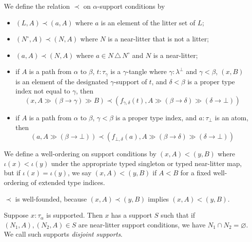 \documentclass{article}
\begin{document}
\begin{definition}
    We define the relation \( \prec \) on \( \alpha \)-support conditions by
    \begin{itemize}
        \item \( (L, A) \prec (a, A) \) where \( a \) is an element of the litter set of \( L \);
        \item \( (N^\circ, A) \prec (N, A) \) where \( N \) is a near-litter that is not a litter;
        \item \( (a, A) \prec (N, A) \) where \( a \in N\,\triangle\,N^\circ \) and \( N \) is a near-litter;
        \item
            if \( A \) is a path from \( \alpha \) to \( \beta \),
            \( t : \tau_\gamma \) is a \( \gamma \)-tangle where \( \gamma : \lambda^\bot \) and \( \gamma < \beta \),
            \( (x, B) \) is an element of the designated \( \gamma \)-support of \( t \),
            and \( \delta < \beta \) is a proper type index not equal to \( \gamma \),
            then
            \[ (x, A \gg (\beta \longrightarrow \gamma) \gg B) \prec (f_{\gamma,\delta}(t), A \gg (\beta \longrightarrow \delta) \gg (\delta \longrightarrow \bot)) \]
        \item if \( A \) is a path from \( \alpha \) to \( \beta \), \( \gamma < \beta \) is a proper type index, and \( a : \tau_\bot \) is an atom, then
        \[ (a, A \gg (\beta \longrightarrow \bot)) \prec (f_{\bot,\delta}(a), A \gg (\beta \longrightarrow \delta) \gg (\delta \longrightarrow \bot)) \]
    \end{itemize}
\end{definition}
\begin{definition}
    We define a well-ordering on support conditions by \( (x, A) < (y, B) \) where \( \iota(x) < \iota(y) \) under the appropriate typed singleton or typed near-litter map, but if \( \iota(x) = \iota(y) \), we say \( (x, A) < (y, B) \) if \( A < B \) for a fixed well-ordering of extended type indices.
\end{definition}
\begin{lemma}
    \( \prec \) is well-founded, because \( (x, A) \prec (y, B) \) implies \( (x, A) < (y, B) \).
\end{lemma}
\begin{lemma}
    Suppose \( x : \tau_\alpha \) is supported.
    Then \( x \) has a support \( S \) such that if \( (N_1, A), (N_2, A) \in S \) are near-litter support conditions, we have \( N_1 \cap N_2 = \varnothing \).
    We call such supports \emph{disjoint supports}.
\end{lemma}
\end{document}
